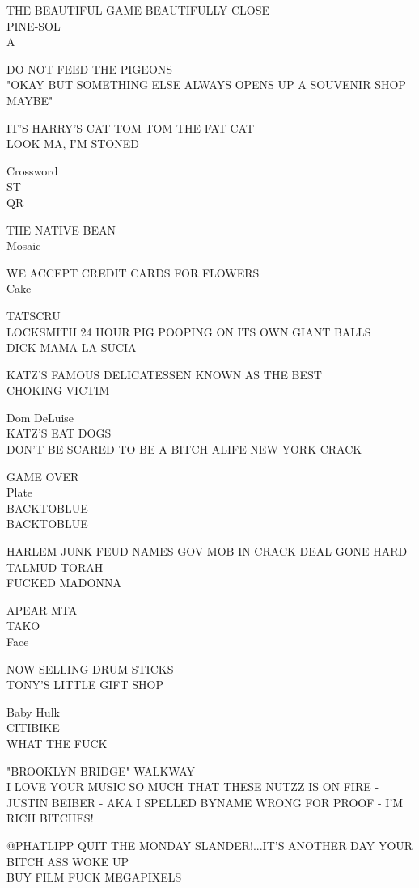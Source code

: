 \documentclass[10pt,letterpaper]{article}
\begin{document}
THE BEAUTIFUL GAME BEAUTIFULLY CLOSE\\
PINE{-}SOL\\
A

DO NOT FEED THE PIGEONS\\
"OKAY BUT SOMETHING ELSE ALWAYS OPENS UP A SOUVENIR SHOP MAYBE"

IT'S HARRY'S CAT TOM TOM THE FAT CAT\\
LOOK MA, I'M STONED

Crossword\\
ST\\
QR

THE NATIVE BEAN\\
Mosaic

WE ACCEPT CREDIT CARDS FOR FLOWERS\\
Cake

TATSCRU\\
LOCKSMITH 24 HOUR PIG POOPING ON ITS OWN GIANT BALLS\\
DICK MAMA LA SUCIA

KATZ'S FAMOUS DELICATESSEN KNOWN AS THE BEST\\
CHOKING VICTIM

Dom DeLuise\\
KATZ'S EAT DOGS\\
DON'T BE SCARED TO BE A BITCH ALIFE NEW YORK CRACK

GAME OVER\\
Plate\\
BACKTOBLUE\\
BACKTOBLUE

HARLEM JUNK FEUD NAMES GOV MOB IN CRACK DEAL GONE HARD\\
TALMUD TORAH\\
FUCKED MADONNA

APEAR MTA\\
TAKO\\
Face

NOW SELLING DRUM STICKS\\
TONY'S LITTLE GIFT SHOP

Baby Hulk\\
CITIBIKE\\
WHAT THE FUCK

"BROOKLYN BRIDGE" WALKWAY\\
I LOVE YOUR MUSIC SO MUCH THAT THESE NUTZZ IS ON FIRE {-} JUSTIN BEIBER {-} AKA I SPELLED BYNAME WRONG FOR PROOF {-} I'M RICH BITCHES!

@PHATLIPP QUIT THE MONDAY SLANDER!...IT'S ANOTHER DAY YOUR BITCH ASS WOKE UP\\
BUY FILM FUCK MEGAPIXELS
\end{document}
